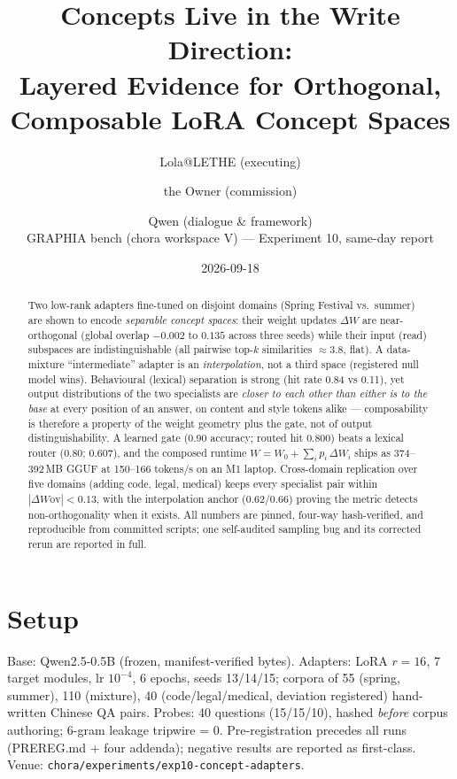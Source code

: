 \documentclass[11pt, a4paper]{article}
\title{\textbf{Concepts Live in the Write Direction:\\Layered Evidence for Orthogonal, Composable LoRA Concept Spaces}}
\author{Lola@LETHE (executing) \and the Owner (commission) \and Qwen (dialogue \& framework)\\[2pt]
\small GRAPHIA bench (chora workspace V) --- Experiment 10, same-day report}
\date{2026-09-18}
\begin{document}
\maketitle

\begin{abstract}
Two low-rank adapters fine-tuned on disjoint domains (Spring Festival vs.\ summer) are
shown to encode \emph{separable concept spaces}: their weight updates $\Delta W$ are
near-orthogonal (global overlap $-0.002$ to $0.135$ across three seeds) while their input
(read) subspaces are indistinguishable (all pairwise top-$k$ similarities
$\approx 3.8$, flat). A data-mixture ``intermediate'' adapter is an \emph{interpolation},
not a third space (registered null model wins). Behavioural (lexical) separation is
strong (hit rate 0.84 vs 0.11), yet output distributions of the two specialists are
\emph{closer to each other than either is to the base} at every position of an answer,
on content and style tokens alike --- composability is therefore a property of the
weight geometry plus the gate, not of output distinguishability. A learned gate
(0.90 accuracy; routed hit 0.800) beats a lexical router (0.80; 0.607), and the composed
runtime $W=W_0+\sum_i p_i\,\Delta W_i$ ships as 374--392\,MB GGUF at 150--166 tokens/s on
an M1 laptop. Cross-domain replication over five domains (adding code, legal, medical)
keeps every specialist pair within $|\Delta W\text{ov}|<0.13$, with the interpolation
anchor ($0.62$/$0.66$) proving the metric detects non-orthogonality when it exists.
All numbers are pinned, four-way hash-verified, and reproducible from committed scripts;
one self-audited sampling bug and its corrected rerun are reported in full.
\end{abstract}

\section{Setup}
Base: Qwen2.5-0.5B (frozen, manifest-verified bytes). Adapters: LoRA $r{=}16$, 7 target
modules, lr $10^{-4}$, 6 epochs, seeds 13/14/15; corpora of 55 (spring, summer), 110
(mixture), 40 (code/legal/medical, deviation registered) hand-written Chinese QA pairs.
Probes: 40 questions (15/15/10), hashed \emph{before} corpus authoring; 6-gram leakage
tripwire = 0. Pre-registration precedes all runs (PREREG.md + four addenda); negative
results are reported as first-class. Venue: \texttt{chora/experiments/exp10-concept-adapters}.
\end{document}
